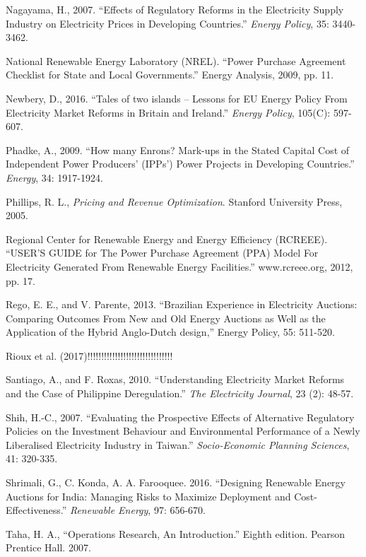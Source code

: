 \documentclass[informs]{informs3}
\begin{document}
\begin{thebibliography}{}
Nagayama, H., 2007. “Effects of Regulatory Reforms in the Electricity Supply Industry on Electricity Prices in Developing Countries.” \textit{Energy Policy}, 35: 3440-3462. 

National Renewable Energy Laboratory (NREL). “Power Purchase Agreement Checklist for State and Local Governments.” Energy Analysis, 2009, pp. 11. 

Newbery, D., 2016. “Tales of two islands – Lessons for EU Energy Policy From Electricity Market Reforms in Britain and Ireland.” \textit{Energy Policy}, 105(C): 597-607. 

Phadke, A., 2009. “How many Enrons? Mark-ups in the Stated Capital Cost of Independent Power Producers’ (IPPs’) Power Projects in Developing Countries.” \textit{Energy}, 34: 1917-1924.

Phillips, R. L., \textit{Pricing and Revenue Optimization}. Stanford University Press, 2005. 


Regional Center for Renewable Energy and Energy Efficiency (RCREEE). “USER’S GUIDE for The Power Purchase Agreement (PPA) Model For Electricity Generated From Renewable Energy Facilities.” www.rcreee.org, 2012, pp. 17.


Rego, E. E., and V. Parente, 2013. “Brazilian Experience in Electricity Auctions: Comparing Outcomes From New and Old Energy Auctions as Well as the Application of the Hybrid Anglo-Dutch design,” Energy Policy, 55: 511-520. 

Rioux et al. (2017)!!!!!!!!!!!!!!!!!!!!!!!!!!!!!!!


Santiago, A., and F. Roxas, 2010. “Understanding Electricity Market Reforms and the Case of Philippine Deregulation.” \textit{The Electricity Journal}, 23 (2): 48-57. 

Shih, H.-C., 2007. “Evaluating the Prospective Effects of Alternative Regulatory Policies on the Investment Behaviour and Environmental Performance of a Newly Liberalised Electricity Industry in Taiwan.” \textit{Socio-Economic Planning Sciences}, 41: 320-335. 

Shrimali, G., C. Konda, A. A. Farooquee. 2016. “Designing Renewable Energy Auctions for India: Managing Risks to Maximize Deployment and Cost-Effectiveness.” \textit{Renewable Energy}, 97: 656-670. 

Taha, H. A., “Operations Research, An Introduction.” Eighth edition. Pearson Prentice Hall. 2007.


\end{thebibliography}
\end{document}

